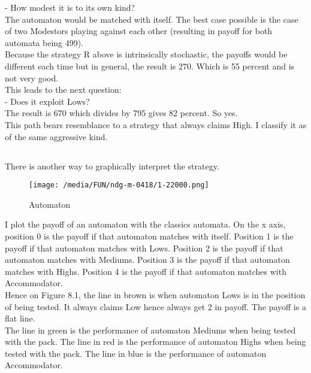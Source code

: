 \documentclass[12.5pt]{report}
\begin{document}
- How modest it is to its own kind?\\

The automaton would be matched with itself. The best case possible is the case of two Modestors playing against each other (resulting in payoff for both automata being 499).\\

Because the strategy R above is intrinsically stochastic, the payoffs would be different each time but in general, the result is 270. Which is 55 percent and is not very good.\\

This leads to the next question:\\

- Does it exploit Lows?\\

The result is 670 which divides by 795 gives 82 percent. So yes.\\

This path bears resemblance to a strategy that always claims High. I classify it as of the same aggressive kind.\\

\subsection{}

There is another way to graphically interpret the strategy.

\begin{figure}[h!]
\center
\texttt{[image: /media/FUN/ndg-m-0418/1-22000.png]}
\caption{Automaton}
\end{figure}

I plot the payoff of an automaton with the classics automata. On the x axis, position 0 is the payoff if that automaton matches with itself. Position 1 is the payoff if that automaton matches with Lows. Position 2 is the payoff if that automaton matches with Mediums. Position 3 is the payoff if that automaton matches with Highs. Position 4 is the payoff if that automaton matches with Accommodator.\\

Hence on Figure 8.1, the line in brown is when automaton Lows is in the position of being tested. It always claims Low hence always get 2 in payoff. The payoff is a flat line.\\

The line in green is the performance of automaton Mediums when being tested with the pack. The line in red is the performance of automaton Highs when being tested with the pack. The line in blue is the performance of automaton Accommodator.\\
\end{document}
